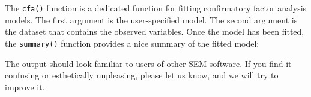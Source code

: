 The \texttt{cfa()} function is a dedicated function for fitting
confirmatory factor analysis models. The first argument is the
user-specified model. The second argument is the dataset that contains
the observed variables. Once the model has been fitted, the
\texttt{summary()} function provides a nice summary of the fitted model:

\begin{Shaded}
\begin{Highlighting}[]
 \NormalTok{)}
\end{Highlighting}
\end{Shaded}

The output should look familiar to users of other SEM software. If you
find it confusing or esthetically unpleasing, please let us know, and we
will try to improve it.

